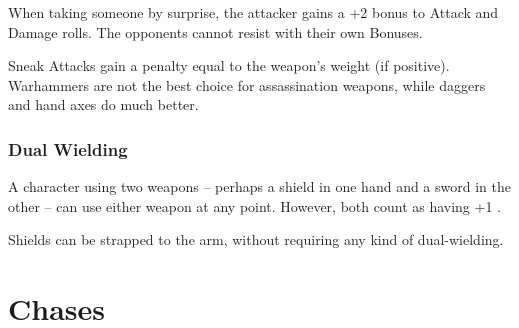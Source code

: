 \begin{multicols}{2}
When taking someone by surprise, the attacker gains a +2 bonus to Attack and Damage rolls.
The opponents cannot resist with their own Bonuses.

Sneak Attacks gain a penalty equal to the weapon's \gls{weight} (if positive).
Warhammers are not the best choice for assassination weapons, while daggers and hand axes do much better.

\subsubsection[Dual Wielding: Both weapons count has having +1 \glsentrytext{weight}]{Dual Wielding}

A character using two weapons -- perhaps a shield in one hand and a sword in the other -- can use either weapon at any point.
However, both count as having +1 .

Shields can be strapped to the arm, without requiring any kind of dual-wielding.

\stopcontents[Manoeuvres]

\end{multicols}

\section{Chases}
\label{chases}

